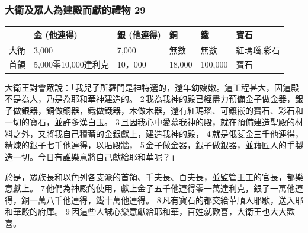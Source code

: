 \begin{table}[H]
\centering
\begin{tabular}{p{2.75cm}|p{}|p{}}\hline\hline

\end{tabular}
\end{table}	 





\subsubsection{大衛及眾人為建殿而獻的禮物 29}
\begin{table}[H]
\centering
\begin{tabular}{|p{1cm}|p{4cm}|p{2.1cm}|p{1.3cm}|p{2.3cm}|p{2.3cm}|}\hline\hline
     &金 (他連得)       &銀 (他連得)          &銅&鐵&寶石 \\\hline
大衛&3,000 &7,000 &無數  & 無數 &紅瑪瑙,彩石\\\hline
首領&5,000零10,000達利克& 10，000 &18,000  & 100,000 &寶石\\\hline
\end{tabular}
\end{table}	 


大衛王對會眾說：「我兒子所羅門是神特選的，還年幼嬌嫩。這工程甚大，因這殿不是為人，乃是為耶和華神建造的。 2 我為我神的殿已經盡力預備金子做金器，銀子做銀器，銅做銅器，鐵做鐵器，木做木器，還有紅瑪瑙、可鑲嵌的寶石、彩石和一切的寶石，並許多漢白玉。 3 且因我心中愛慕我神的殿，就在預備建造聖殿的材料之外，又將我自己積蓄的金銀獻上，建造我神的殿， 4 就是俄斐金三千他連得，精煉的銀子七千他連得，以貼殿牆， 5 金子做金器，銀子做銀器，並藉匠人的手製造一切。今日有誰樂意將自己獻給耶和華呢？」

於是，眾族長和以色列各支派的首領、千夫長、百夫長，並監管王工的官長，都樂意獻上。 7 他們為神殿的使用，獻上金子五千他連得零一萬達利克，銀子一萬他連得，銅一萬八千他連得，鐵十萬他連得。 8 凡有寶石的都交給革順人耶歇，送入耶和華殿的府庫。 9 因這些人誠心樂意獻給耶和華，百姓就歡喜，大衛王也大大歡喜。

